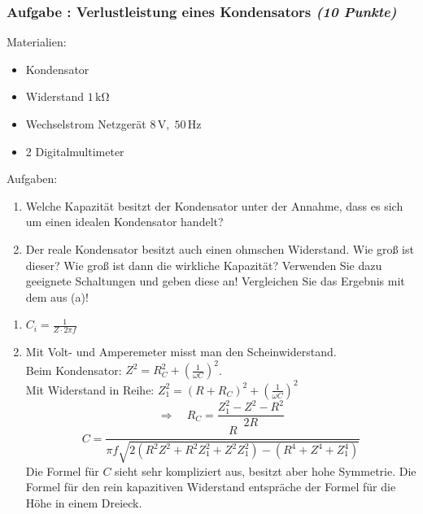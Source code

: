 \documentclass[12pt,a4paper]{article}
\newcommand{\unit}[1]{\,\mathrm{#1}}
\newenvironment{abcenum}{\renewcommand{\labelenumi}{(\alph{enumi})} \begin{enumerate}}{\end{enumerate}\renewcommand{\labelenumi}{\theenumi .}}
\newcounter{numlabel}
\newenvironment{problem}[2]{\stepcounter{numlabel} \vspace{1ex} \subsubsection*{Aufgabe \the\value{numlabel}: #1 \emph{(#2 Punkte)}} \renewcommand{\Currentlabel}{Aufgabe \the\value{numlabel}: #1}}{

}
\begin{document}
\begin{problem}{Verlustleistung eines Kondensators}{10}
Materialien:
\begin{itemize}
\item Kondensator
\item Widerstand $1\unit{k\Omega}$
\item Wechselstrom Netzgerät $8\unit{V},\; 50\unit{Hz}$
\item 2 Digitalmultimeter
\end{itemize}
Aufgaben:
\begin{abcenum}
\item Welche Kapazität besitzt der Kondensator unter der Annahme, dass es sich um einen idealen Kondensator handelt?
\item Der reale Kondensator besitzt auch einen ohmschen Widerstand. Wie groß ist dieser? Wie groß ist dann die wirkliche Kapazität? Verwenden Sie dazu geeignete Schaltungen und geben diese an! Vergleichen Sie das Ergebnis mit dem aus (a)!
\end{abcenum}
\begin{expsolution}
\begin{abcenum}
\item $C_i=\frac{1}{Z\cdot 2\pi f}$
\item Mit Volt- und Amperemeter misst man den Scheinwiderstand.\\
Beim Kondensator: $Z^2=R_C^2+(\frac{1}{\omega C})^2$.\\
Mit Widerstand in Reihe: $Z_1^2=(R+R_C)^2+(\frac{1}{\omega C})^2$
\[
\Rightarrow\quad R_C=\frac{Z_1^2-Z^2-R^2}{2R}
\]
\[
C=\frac{R}{\pi f \sqrt{2(R^2Z^2+R^2Z_1^2+Z^2Z_1^2)-(R^4+Z^4+Z_1^4)}}
\]
Die Formel für $C$ sieht sehr kompliziert aus, besitzt aber hohe Symmetrie. Die Formel für den rein kapazitiven Widerstand entspräche der Formel für die Höhe in einem Dreieck.
\end{abcenum}
\end{expsolution}
\end{problem}
\end{document}
